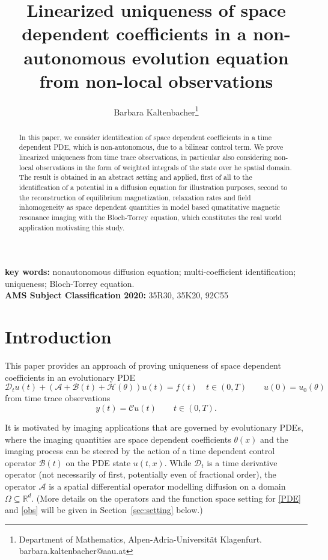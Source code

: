\documentclass[12pt]{article}
\newcommand\DD{\mathcal{D}}
\newcommand\calA{\mathcal{A}}
\newcommand\BB{\mathcal{B}}
\newcommand\HH{\mathcal{H}}
\begin{document}
\title{Linearized uniqueness of space dependent coefficients in a non-autonomous evolution equation from non-local observations}
\author{Barbara Kaltenbacher\footnote{
Department of Mathematics,
Alpen-Adria-Universit\"at Klagenfurt.
barbara.kaltenbacher@aau.at}
}

\maketitle
\begin{abstract}
In this paper, we consider identification of space dependent coefficients in a time dependent PDE, which is non-autonomous, due to a bilinear control term.
We prove linearized uniqueness from time trace observations, in particular also considering non-local observations in the form of weighted integrals of the state over he spatial domain.
The result is obtained in an abstract setting and applied, first of all to the identification of a potential in a diffusion equation for illustration purposes, second to the reconstruction of equilibrium magnetization, relaxation rates and field inhomogeneity as space dependent quantities in model based qunatitative magnetic resonance imaging with the Bloch-Torrey equation, which constitutes the real world application motivating this study.
\end{abstract}

\noindent
\textbf{key words:} nonautonomous diffusion equation; multi-coefficient identification; uniqueness; Bloch-Torrey equation.\\
\textbf{AMS Subject Classification 2020:} 35R30, 35K20, 92C55

\section{Introduction}\label{sec:intro}
This paper provides an approach of proving uniqueness of space dependent coefficients in an evolutionary PDE 
\begin{equation}\label{PDE}
\DD_t u(t) +(\calA+ \BB(t)+\HH(\theta))u(t)=f(t) \quad t\in(0,T)\qquad u(0)=u_0(\theta)
\end{equation}
from time trace observations
\begin{equation}\label{obs}
y(t)=\mathcal{C}u(t)  \qquad t\in(0,T).
\end{equation}

It is motivated by imaging applications that are governed by evolutionary PDEs, where the imaging quantities are space dependent coefficients $\theta(x)$ and the imaging process can be steered by the action of a time dependent control operator $\BB(t)$ on the PDE state $u(t,x)$.
While $\DD_t$ is a time derivative operator (not necessarily of first, potentially even of fractional order), the operator $\calA$ is a spatial differential operator modelling diffusion on a domain $\Omega\subseteq\mathbb{R}^d$. (More details on the operators and the function space setting for \eqref{PDE} and \eqref{obs} will be given in Section~\ref{sec:setting} below.)
\end{document}
